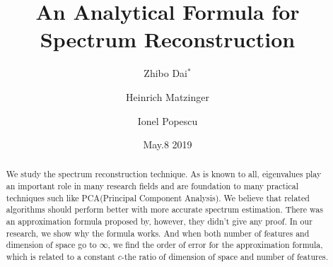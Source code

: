 \documentclass[12pt]{amsart}
\theoremstyle{definition}
\numberwithin{equation}{section}
\numberwithin{equation}{section}
\theoremstyle{remark}
\numberwithin{equation}{section}
\begin{document}



\title{An Analytical Formula for Spectrum Reconstruction}

\author{Zhibo Dai$^{*}$}
\author{Heinrich Matzinger}
\author{Ionel Popescu}
\address{School of Mathematics, Georgia Institute of Technology, Altanta, GA 30313}



\renewcommand{\shortauthors}{Z.Dai, H.Matzinger, I.Popescu}



\date{May.8 2019}


\begin{abstract}
{We study the spectrum reconstruction technique. As is known to all, eigenvalues play an important role in many research fields and are foundation to many practical techniques such like PCA(Principal Component Analysis). We believe that related algorithms should perform better with more accurate spectrum estimation. There was an approximation formula proposed by\cite{amsalu2018recovery}, however, they didn't give any proof. In our research, we show why the formula works. And when both number of features and dimension of space go to $\infty$, we find the order of error for the approximation formula, which is related to a constant $c$-the ratio of dimension of space and number of features.}
\end{abstract}

\maketitle
\end{document}
